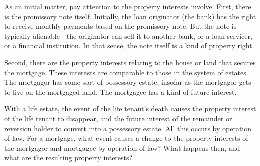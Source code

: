 
\item As an initial matter, pay attention to the property interests involve.
First, there is the promissory note itself. Initially, the loan originator (the
bank) has the right to receive monthly payments based on the promissory note.
But the note is typically alienable---the originator can sell it to another
bank, or a loan servicer, or a financial institution. In that sense, the note
itself is a kind of property right.

\item Second, there are the property interests relating to the house or land
that secures the mortgage. These interests are comparable to those in the system
of estates. The mortgagor has some sort of possessory estate, insofar as the
mortgagor gets to live on the mortgaged land. The mortgagee has a kind of future
interest.

With a life estate, the event of the life tenant's death causes the property
interest of the life tenant to disappear, and the future interest of the
remainder or reversion holder to convert into a possessory estate. All this
occurs by operation of law. For a mortgage, what event causes a change to the
property interests of the mortgagor and mortgagee by operation of law? What
happens then, and what are the resulting property interests?

\item 


